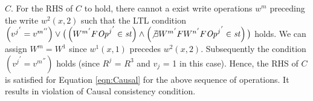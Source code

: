 \documentclass{sig-alternate-05-2015}
\begin{document}
  $C$. For the RHS of $C$ to hold, there cannot a exist write operations $w^m$ preceding the write $w^2(x,2)$ such that the
  LTL condition $\left( {v^j}^{'} = {v^m}^{''} \right) \vee
 \big( \left( {W^m}^{'} F {\mathit{Op}^j}^{'} \in \mathit{st} \right) \wedge
\left( \not\exists {W^m}^{'} F {W^n}^{'} F {\mathit{Op}^j}^{'} \in \mathit{st} \right) \big)$
 holds.
 We can assign $W^m = W^1$ since $w^1(x,1)$ precedes $w^2(x,2)$. Subsequently the condition $\left( {v^j}^{'} = {v^m}^{''} \right)$
 holds (since $R^j$ = $R^3$ and $v_j$ = 1 in this case). Hence, the RHS of $C$ is satisfied for Equation \ref{eqn:Causal} for the above sequence of operations.
 It results in
   violation of Causal consistency condition.
\end{document}
